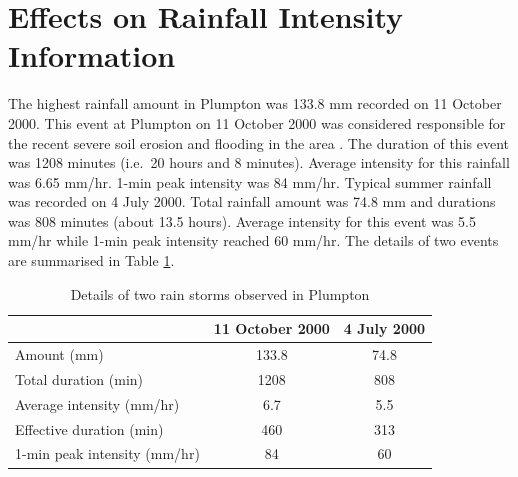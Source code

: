 


\section{Effects on Rainfall Intensity Information}
\label{sec:EffectsOnRainfallIntensityInput}
The highest rainfall amount in Plumpton was 133.8 mm recorded on 11 October
2000. This  event at Plumpton on 11 October 2000 was considered responsible for
the recent severe soil erosion and flooding in the area \citep{boardman2001-346,
marsh2001-343, saunders2001-360}. The duration of this event was 1208 minutes
(i.e.\ 20 hours and 8 minutes). Average intensity for this rainfall was 6.65
mm/hr. 1-min peak intensity was 84 mm/hr. Typical summer rainfall was recorded
on 4 July 2000. Total rainfall amount was 74.8 mm and durations was 808 minutes
(about 13.5 hours). Average intensity for this event was 5.5 mm/hr while 1-min
peak intensity reached 60 mm/hr. The details of two events are summarised in
Table \ref{tab:DetailsoftworainstormsobservedinPlumpton}.

\begin{table}[htbp]
  \centering
  \small
  \caption{Details of two rain storms observed in Plumpton}
  \label{tab:DetailsoftworainstormsobservedinPlumpton}
    \begin{tabular}{lcc}
    \toprule
     & 11 October 2000 & 4 July 2000 \\
    \midrule
    Amount (mm) & 133.8 & 74.8\\
    Total duration (min) & 1208 & 808 \\
    Average intensity (mm/hr) & 6.7 & 5.5 \\
    Effective duration (min) & 460 & 313 \\
    1-min peak intensity (mm/hr) & 84 & 60 \\
    \bottomrule
    \end{tabular}
\end{table}


